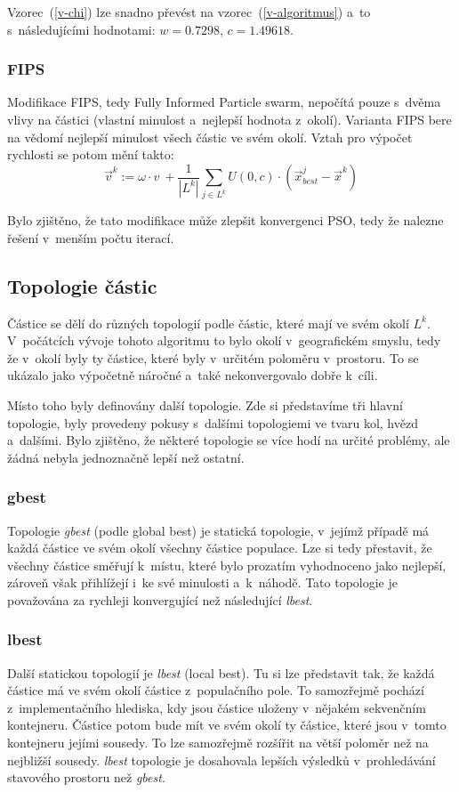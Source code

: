 \documentclass[12pt,a4paper,fleqn]{article}
\begin{document}
Vzorec~(\ref{v-chi}) lze snadno převést na vzorec~(\ref{v-algoritmus}) a~to s~následujícími hodnotami: $w=0.7298$, $c=1.49618$.

\subsubsection{FIPS}
Modifikace FIPS, tedy Fully Informed Particle swarm, nepočítá pouze s~dvěma vlivy na částici (vlastní minulost a~nejlepší hodnota z~okolí). Varianta FIPS bere na vědomí nejlepší minulost všech částic ve svém okolí. Vztah pro výpočet rychlosti se potom mění takto:
\begin{equation}
\vec{v}^k  :=  \omega \cdot v~+ \frac{1}{|L^k|} \sum_{j \in L^k} U(0,c) \cdot (\vec{x}^j_{best} - \vec{x}^k)
\end{equation}

Bylo zjištěno, že tato modifikace může zlepšit konvergenci PSO, tedy že nalezne řešení v~menším počtu iterací.

\subsection{Topologie částic}
Částice se dělí do různých topologií podle částic, které mají ve svém okolí $L^k$. V~počátcích vývoje tohoto algoritmu to bylo okolí v~geografickém smyslu, tedy že v~okolí byly ty částice, které byly v~určitém poloměru v~prostoru. To se ukázalo jako výpočetně náročné a~také nekonvergovalo dobře k~cíli.

Místo toho byly definovány další topologie. Zde si představíme tři hlavní topologie, byly provedeny pokusy s~dalšími topologiemi ve tvaru kol, hvězd a~dalšími. Bylo zjištěno, že některé topologie se více hodí na určité problémy, ale žádná nebyla jednoznačně lepší než ostatní.

\subsubsection{gbest}
Topologie \textit{gbest} (podle global best) je statická topologie, v~jejímž případě má každá částice ve svém okolí všechny částice populace. Lze si tedy přestavit, že všechny částice směřují k~místu, které bylo prozatím vyhodnoceno jako nejlepší, zároveň však přihlížejí i~ke své minulosti a~k~náhodě. Tato topologie je považována za rychleji konvergující než následující \textit{lbest}.

\subsubsection{lbest}
Další statickou topologií je \textit{lbest} (local best). Tu si lze představit tak, že každá částice má ve svém okolí částice z~populačního pole. To samozřejmě pochází z~implementačního hlediska, kdy jsou částice uloženy v~nějakém sekvenčním kontejneru. Částice potom bude mít ve svém okolí ty částice, které jsou v~tomto kontejneru jejími sousedy. To lze samozřejmě rozšířit na větší poloměr než na nejbližší sousedy. \textit{lbest} topologie je dosahovala lepších výsledků v~prohledávání stavového prostoru než \textit{gbest}.
\end{document}

